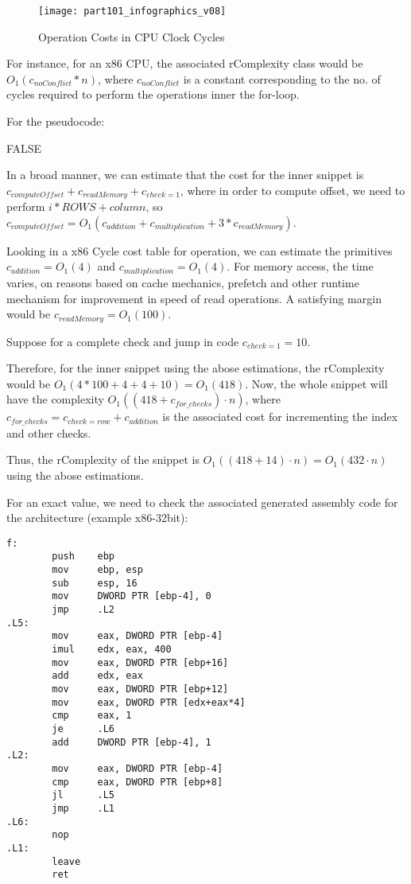 \begin{figure}[H]
\centering
\texttt{[image: part101\_infographics\_v08]}
\caption{Operation Costs in CPU Clock Cycles\cite{archcost}}
\end{figure}

For instance, for an x86 CPU, the associated rComplexity class would be
$ O_{1}(c_{noConflict} * n) $, where $c_{noConflict}$ is a constant corresponding to the no. of cycles required to perform the operations inner the for-loop.

For the pseudocode:
\begin{algorithmic}[1]
			\State \Return FALSE
		\EndIf
	\EndFor
\end{algorithmic}
In a broad manner, we can estimate that the cost for the inner snippet is $c_{computeOffset} + c_{readMemory} + c_{check=1}$, where in order to compute offset, we need to perform $i * ROWS + column$, so
$ c_{computeOffset} = O_{1}(c_{addition} + c_{multiplication} + 3 * c_{readMemory})$.

Looking in a x86 Cycle cost table for operation, we can estimate the primitives $c_{addition} = O_{1}(4)$ and $c_{multiplication} = O_{1}(4)$. For memory access, the time varies, on reasons based on cache mechanics, prefetch and other runtime mechanism for improvement in speed of read operations. A satisfying margin would be $c_{readMemory} = O_{1}(100)$. 

Suppose for a complete check and jump in code $c_{check=1} = 10$.

Therefore, for the inner snippet using the abose estimations, the rComplexity would be $O_{1}(4 * 100 + 4 + 4 + 10) = O_{1}(418)$. Now, the whole snippet will have the complexity $O_{1}((418 + c_{for\_checks}) \cdot n)$, where  $c_{for\_checks} = c_{check=row} + c_{addition}$ is the associated cost for incrementing the index and other checks. 

Thus, the rComplexity of the snippet is $O_{1}((418 + 14) \cdot n) = O_{1}(432 \cdot n)$ using the abose estimations.

 
For an exact value, we need to check the associated generated assembly code for the architecture (example x86-32bit):
\begin{verbatim}
f:
        push    ebp
        mov     ebp, esp
        sub     esp, 16
        mov     DWORD PTR [ebp-4], 0
        jmp     .L2
.L5:
        mov     eax, DWORD PTR [ebp-4]
        imul    edx, eax, 400
        mov     eax, DWORD PTR [ebp+16]
        add     edx, eax
        mov     eax, DWORD PTR [ebp+12]
        mov     eax, DWORD PTR [edx+eax*4]
        cmp     eax, 1
        je      .L6
        add     DWORD PTR [ebp-4], 1
.L2:
        mov     eax, DWORD PTR [ebp-4]
        cmp     eax, DWORD PTR [ebp+8]
        jl      .L5
        jmp     .L1
.L6:
        nop
.L1:
        leave
        ret  
\end{verbatim}


